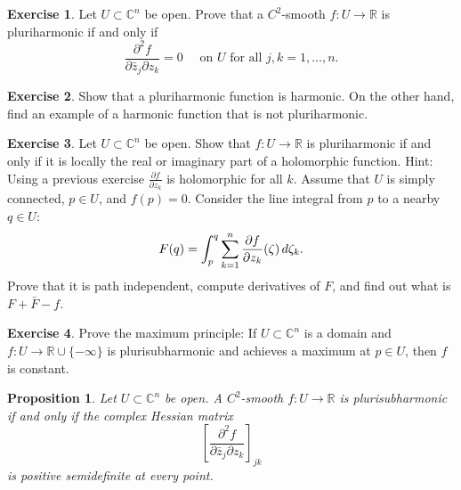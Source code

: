 \documentclass[12pt,openany]{book}
\newcommand{\avoidbreak}{\postdisplaypenalty=100}
\newcommand{\C}{{\mathbb{C}}}
\newcommand{\R}{{\mathbb{R}}}
\theoremstyle{plain}
\newtheorem{prop}[thm]{Proposition}
\theoremstyle{remark}
\theoremstyle{definition}
\newenvironment{exbox}{%
    \def\FrameCommand{\vrule width 1pt \relax\hspace{10pt}}%
    \MakeFramed{\advance\hsize-\width\FrameRestore}%
}{%
    \endMakeFramed
}
\theoremstyle{exercise}
\newtheorem{exercise}{Exercise}[section]
\theoremstyle{example}
\begin{document}
\begin{exbox}
\begin{exercise}
Let $U \subset \C^n$ be open.
Prove that
a $C^2$-smooth $f \colon U \to \R$ is pluriharmonic if and
only if
\begin{equation*}
\frac{\partial^2 f}{\partial \bar{z}_j \partial z_k} = 0
\quad \text{ on $U$ for all $j,k=1,\ldots,n$.}
\end{equation*}
\end{exercise}

\begin{exercise}
Show that a pluriharmonic function is harmonic.  On the other hand, find an
example of a harmonic function that is not pluriharmonic.
\end{exercise}

\begin{exercise}
Let $U \subset \C^n$ be open.
Show that $f \colon U \to \R$ is pluriharmonic if and
only if it is locally the real or imaginary part of a holomorphic function.
Hint:  Using a previous exercise
$\frac{\partial f}{\partial z_k}$ is holomorphic for all $k$.
Assume that $U$ is simply connected, $p \in U$, and
$f(p) = 0$.
Consider the line integral from $p$ to a nearby $q \in U$:
\begin{equation*}
F(q) =
\int_{p}^q \sum_{k=1}^n
\frac{\partial f}{\partial z_k}(\zeta) \, d\zeta_k .
\avoidbreak
\end{equation*}
Prove that it is path independent, compute derivatives of $F$, and
find out what is $F+\bar{F}-f$.
\end{exercise}

\begin{exercise}
Prove the maximum
principle:
If $U \subset \C^n$ is a domain and $f \colon U \to \R \cup
\{-\infty\}$ is
plurisubharmonic and achieves a maximum at $p \in U$, then $f$ is constant.
\end{exercise}
\end{exbox}

\begin{samepage}
\begin{prop}
Let $U \subset \C^n$ be open.
A $C^2$-smooth $f \colon U \to \R$ is plurisubharmonic
if and only if the complex Hessian matrix
\begin{equation*}
\left[
\frac{\partial^2 f}{\partial \bar{z}_j \partial z_k}
\right]_{jk}
\end{equation*}
is positive semidefinite at every
point.
\end{prop}
\end{samepage}
\end{document}
